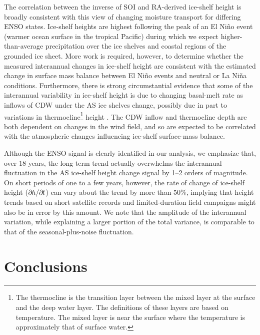 The correlation between the inverse of SOI and RA-derived ice-shelf height is broadly consistent with this view of changing moisture transport for differing ENSO states. Ice-shelf heights are highest following the peak of an El Ni\~no event (warmer ocean surface in the tropical Pacific) during which we expect higher-than-average precipitation over the ice shelves and coastal regions of the grounded ice sheet. More work is required, however, to determine whether the measured interannual changes in ice-shelf height are consistent with the estimated change in surface mass balance between El Ni\~no events and neutral or La Ni\~na conditions. Furthermore, there is strong circumstantial evidence that some of the interannual variability in ice-shelf height is due to changing basal-melt rate as inflows of CDW under the AS ice shelves change, possibly due in part to variations in thermocline\footnote{ The thermocline is the transition layer between the mixed layer at the surface and the deep water layer. The definitions of these layers are based on temperature. The mixed layer is near the surface where the temperature is approximately that of surface water.} height \parencite{Dutrieux2014}. The CDW inflow and thermocline depth are both dependent on changes in the wind field, and so are expected to be correlated with the atmospheric changes influencing ice-shelf surface-mass balance.

Although the ENSO signal is clearly identified in our analysis, we emphasize that, over 18 years, the long-term trend actually overwhelms the interannual fluctuation in the AS ice-shelf height change signal by 1--2 orders of magnitude. On short periods of one to a few years, however, the rate of change of ice-shelf height ($\partial\mkern-1.5mu h/\partial\mkern-1.5mu t$) can vary about the trend by more than 50\%, implying that height trends based on short satellite records and limited-duration field campaigns might also be in error by this amount. We note that the amplitude of the interannual variation, while explaining a larger portion of the total variance, is comparable to that of the seasonal-plus-noise fluctuation. 


\section{Conclusions}

